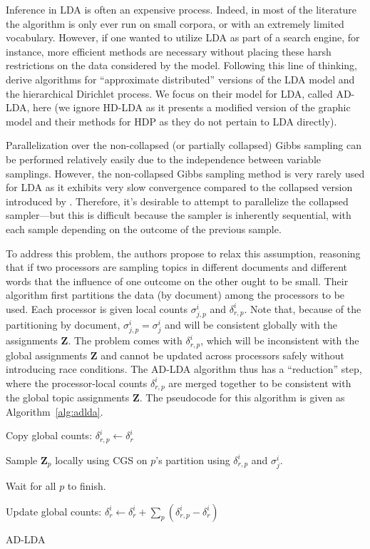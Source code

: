 \documentclass[11pt]{article}
\begin{document}
Inference in LDA is often an expensive process. Indeed, in most of the
literature the algorithm is only ever run on small corpora, or with an
extremely limited vocabulary. However, if one wanted to utilize LDA as part
of a search engine, for instance, more efficient methods are necessary
without placing these harsh restrictions on the data considered by the
model. Following this line of thinking, \citet{Newman:2009:ADLDA} derive
algorithms for ``approximate distributed'' versions of the LDA model and
the hierarchical Dirichlet process. We focus on their model for LDA, called
AD-LDA, here (we ignore HD-LDA as it presents a modified version of the
graphic model and their methods for HDP as they do not pertain to LDA
directly).

Parallelization over the non-collapsed (or partially collapsed) Gibbs
sampling can be performed relatively easily due to the independence between
variable samplings. However, the non-collapsed Gibbs sampling method is
very rarely used for LDA as it exhibits very slow convergence compared to
the collapsed version introduced by \citet{Griffiths:2004:Topics}.
Therefore, it's desirable to attempt to parallelize the collapsed
sampler---but this is difficult because the sampler is inherently
sequential, with each sample depending on the outcome of the previous
sample.

To address this problem, the authors propose to relax this assumption,
reasoning that if two processors are sampling topics in different documents
and different words that the influence of one outcome on the other ought to
be small. Their algorithm first partitions the data (by document) among the
processors to be used. Each processor is given local counts
$\sigma_{j,p}^i$ and $\delta_{r,p}^i$. Note that, because of the
partitioning by document, $\sigma_{j,p}^i = \sigma_j^i$ and will be
consistent globally with the assignments $\mathbf{Z}$. The problem comes
with $\delta_{r,p}^i$, which will be inconsistent with the global
assignments $\mathbf{Z}$ and cannot be updated across processors safely
without introducing race conditions. The AD-LDA algorithm thus has a
``reduction'' step, where the processor-local counts $\delta_{r,p}^i$ are
merged together to be consistent with the global topic assignments
$\mathbf{Z}$. The pseudocode for this algorithm is given as
Algorithm~\ref{alg:adlda}.

\begin{algorithm}
  \begin{algorithmic}
    \Repeat

        Copy global counts: $\delta_{r,p}^i \leftarrow \delta_r^i$

        Sample $\mathbf{Z}_p$ locally using CGS on $p$'s partition using
        $\delta_{r,p}^i$ and $\sigma_j^i$.
      \EndFor

      Wait for all $p$ to finish.

      Update global counts: $\delta_r^i \leftarrow \delta_r^i + \sum_p
      (\delta_{r,p}^i - \delta_r^i)$
  \end{algorithmic}
  \caption{AD-LDA}
  \label{alg:adlda}
\end{algorithm}
\end{document}

